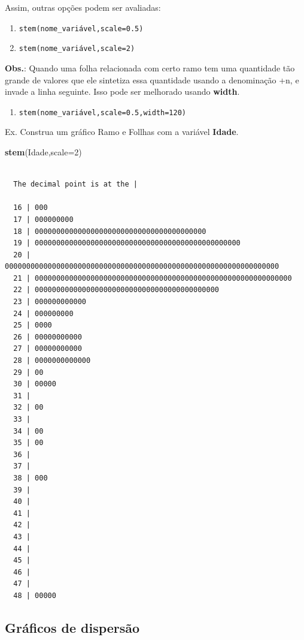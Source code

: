 \documentclass[12pt,brazil,oneside]{book}
\newenvironment{Shaded}{\begin{snugshade}}{\end{snugshade}}
\newcommand{\DataTypeTok}[1]{\textcolor[rgb]{0.13,0.29,0.53}{#1}}
\newcommand{\DecValTok}[1]{\textcolor[rgb]{0.00,0.00,0.81}{#1}}
\newcommand{\KeywordTok}[1]{\textcolor[rgb]{0.13,0.29,0.53}{\textbf{#1}}}
\newcommand{\NormalTok}[1]{#1}
\providecommand{\tightlist}{%
  \setlength{\itemsep}{0pt}\setlength{\parskip}{0pt}}
\begin{document}
Assim, outras opções podem ser avaliadas:

\begin{enumerate}
\def\labelenumi{\alph{enumi})}
\item
  \texttt{stem(nome\_variável,scale=0.5)}
\item
  \texttt{stem(nome\_variável,scale=2)}
\end{enumerate}

\textbf{Obs.}: Quando uma folha relacionada com certo ramo tem uma quantidade tão grande de valores que ele sintetiza essa quantidade usando a denominação +n, e invade a linha seguinte. Isso pode ser melhorado usando \textbf{width}.

\begin{enumerate}
\def\labelenumi{\alph{enumi})}
\setcounter{enumi}{2}
\tightlist
\item
  \texttt{stem(nome\_variável,scale=0.5,width=120)}
\end{enumerate}

Ex. Construa um gráfico Ramo e Follhas com a variável \textbf{Idade}.

\begin{Shaded}
\begin{Highlighting}[]
\KeywordTok{stem}\NormalTok{(Idade,}\DataTypeTok{scale=}\DecValTok{2}\NormalTok{)}
\end{Highlighting}
\end{Shaded}

\begin{verbatim}

  The decimal point is at the |

  16 | 000
  17 | 000000000
  18 | 0000000000000000000000000000000000000000
  19 | 000000000000000000000000000000000000000000000000
  20 | 0000000000000000000000000000000000000000000000000000000000000000
  21 | 000000000000000000000000000000000000000000000000000000000000
  22 | 0000000000000000000000000000000000000000000
  23 | 000000000000
  24 | 000000000
  25 | 0000
  26 | 00000000000
  27 | 00000000000
  28 | 0000000000000
  29 | 00
  30 | 00000
  31 | 
  32 | 00
  33 | 
  34 | 00
  35 | 00
  36 | 
  37 | 
  38 | 000
  39 | 
  40 | 
  41 | 
  42 | 
  43 | 
  44 | 
  45 | 
  46 | 
  47 | 
  48 | 00000
\end{verbatim}

\hypertarget{graficos-de-dispersao}{%
\subsection{Gráficos de dispersão}\label{graficos-de-dispersao}}
\end{document}
